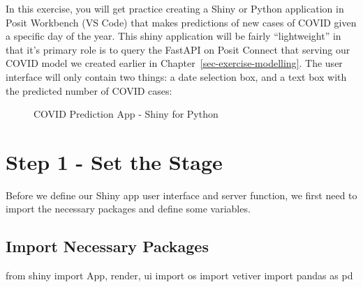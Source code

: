 \documentclass[
  letterpaper,
  DIV=11,
  numbers=noendperiod]{scrreprt}
\newenvironment{Shaded}{\begin{snugshade}}{\end{snugshade}}
\newcommand{\ImportTok}[1]{\textcolor[rgb]{0.00,0.46,0.62}{#1}}
\newcommand{\NormalTok}[1]{\textcolor[rgb]{0.00,0.23,0.31}{#1}}
\begin{document}
In this exercise, you will get practice creating a Shiny or Python
application in Posit Workbench (VS Code) that makes predictions of new
cases of COVID given a specific day of the year. This shiny application
will be fairly ``lightweight'' in that it's primary role is to query the
FastAPI on Posit Connect that serving our COVID model we created earlier
in Chapter~\ref{sec-exercise-modelling}. The user interface will only
contain two things: a date selection box, and a text box with the
predicted number of COVID cases:

\begin{figure}


\caption{\label{fig-shiny-ui-py}COVID Prediction App - Shiny for Python}

\end{figure}%

\section{Step 1 - Set the Stage}\label{step-1---set-the-stage}

Before we define our Shiny app user interface and server function, we
first need to import the necessary packages and define some variables.

\subsection{Import Necessary Packages}\label{import-necessary-packages}

\begin{Shaded}
\begin{Highlighting}[]
\ImportTok{from}\NormalTok{ shiny }\ImportTok{import}\NormalTok{ App, render, ui}
\ImportTok{import}\NormalTok{ os}
\ImportTok{import}\NormalTok{ vetiver}
\ImportTok{import}\NormalTok{ pandas }\ImportTok{as}\NormalTok{ pd}
\end{Highlighting}
\end{Shaded}
\end{document}
